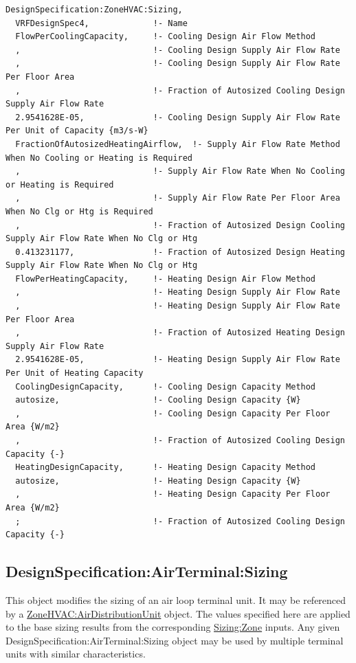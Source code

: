 \begin{lstlisting}
DesignSpecification:ZoneHVAC:Sizing,
  VRFDesignSpec4,             !- Name
  FlowPerCoolingCapacity,     !- Cooling Design Air Flow Method
  ,                           !- Cooling Design Supply Air Flow Rate
  ,                           !- Cooling Design Supply Air Flow Rate Per Floor Area
  ,                           !- Fraction of Autosized Cooling Design Supply Air Flow Rate
  2.9541628E-05,              !- Cooling Design Supply Air Flow Rate Per Unit of Capacity {m3/s-W}
  FractionOfAutosizedHeatingAirflow,  !- Supply Air Flow Rate Method When No Cooling or Heating is Required
  ,                           !- Supply Air Flow Rate When No Cooling or Heating is Required
  ,                           !- Supply Air Flow Rate Per Floor Area When No Clg or Htg is Required
  ,                           !- Fraction of Autosized Design Cooling Supply Air Flow Rate When No Clg or Htg
  0.413231177,                !- Fraction of Autosized Design Heating Supply Air Flow Rate When No Clg or Htg
  FlowPerHeatingCapacity,     !- Heating Design Air Flow Method
  ,                           !- Heating Design Supply Air Flow Rate
  ,                           !- Heating Design Supply Air Flow Rate Per Floor Area
  ,                           !- Fraction of Autosized Heating Design Supply Air Flow Rate
  2.9541628E-05,              !- Heating Design Supply Air Flow Rate Per Unit of Heating Capacity
  CoolingDesignCapacity,      !- Cooling Design Capacity Method
  autosize,                   !- Cooling Design Capacity {W}
  ,                           !- Cooling Design Capacity Per Floor Area {W/m2}
  ,                           !- Fraction of Autosized Cooling Design Capacity {-}
  HeatingDesignCapacity,      !- Heating Design Capacity Method
  autosize,                   !- Heating Design Capacity {W}
  ,                           !- Heating Design Capacity Per Floor Area {W/m2}
  ;                           !- Fraction of Autosized Cooling Design Capacity {-}
\end{lstlisting}

\subsection{DesignSpecification:AirTerminal:Sizing}\label{designspecificationairterminalsizing}

This object modifies the sizing of an air loop terminal unit. It may be referenced by a \hyperref[zonehvacairdistributionunit]{ZoneHVAC:AirDistributionUnit} object. The values specified here are applied to the base sizing results from the corresponding \hyperref[sizingzone]{Sizing:Zone} inputs. Any given DesignSpecification:AirTerminal:Sizing object may be used by multiple terminal units with similar characteristics.

